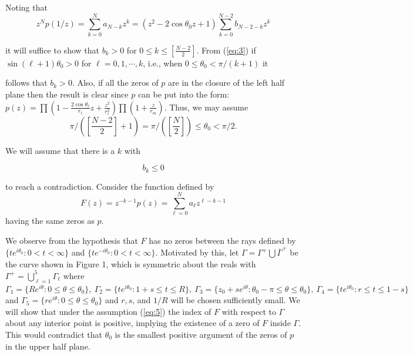 \noindent Noting that $$z^N p(1/z) = \sum^N_{k=0} a_{N-k} z^k =
\left(z^2 -2\cos \theta_0 z+1\right) \sum^{N-2}_{k=0} b_{N-2-k} z^k$$ 

\noindent it will suffice to show that $b_k >  0$ for $0\leq k \leq
[\frac{N-2}{2}]$.  From (\ref{eq:3}) if \linebreak $\sin (\ell +1)
\theta_0 > 0$ for $\ell = 0, 1, \cdots, k$, i.e., when $0 \leq
\theta_0 < \pi/(k+1)$ it 

\begin{figure}\vspace{3in}\caption{}\end{figure} 


follows that $b_k > 0$.  Also, if all
the zeros of $p$ are in the closure of the left half plane then the
result is clear since $p$ can be put into the form: $p(z) = \prod
(1 - \frac{2\cos \theta_\ell}{r_\ell} z + \frac{z^2}{r^2_{\ell}}) \prod(1 + \frac{z}{r_m})$.  Thus,
we may assume
\begin{equation} \pi/\left(\left[\frac{N-2}{2}\right] +1\right) =
\pi/\left(\left[\frac{N}{2}\right]\right) \leq \theta_0 <
\pi/2.\label{eq:4}\end{equation}

We will assume that there is a $k$ with

\begin{equation} b_k \leq 0\label{eq:5}\end{equation} 

\noindent to reach a contradiction.  Consider the function defined by
$$F(z) = {z}^{-k-1} p(z) = \sum^N_{\ell =0} a_\ell z^{\ell- k-1}$$
having the same zeros as $p$.

We observe from the hypothesis that $F$ has no zeros between the rays
defined by $\{te^{i\theta_0}: 0 < t < \infty\}$ and $\{te^{-i
\theta_0}: 0 < t < \infty\}$.  Motivated by this, let $\Gamma =
\Gamma ^+\bigcup\overline\Gamma ^+$ be the curve shown in Figure 1,
which is symmetric about the reals with $\Gamma^+ =
\bigcup^{5}_{\ell=1} \Gamma_\ell$ where $\Gamma_1 = \{Re^{i\theta}:0
\leq \theta \leq \theta_0\},\ \Gamma_2 = \{te^{i\theta_0}: 1 + s \leq
t \leq R\},\ \Gamma_3 = \{z_0 + se^{i\theta}: \theta_0 - \pi \leq
\theta \leq \theta_0\},\ \Gamma_4 = \{t e^{i\theta_0}: r \leq t \leq
1 -s\}$ and $\Gamma_5 = \{re^{i\theta}: 0 \leq \theta \leq
\theta_0\}$ and $r, s$, and $1/R$ will be chosen sufficiently small.
We will show that under the assumption (\ref{eq:5}) the index of $F$
with respect to $\Gamma$ about any interior point is positive,
implying the existence of a zero of $F$ inside $\Gamma$.  This would
contradict that $\theta_0$ is the smallest positive argument of the
zeros of $p$ in the upper half plane.

